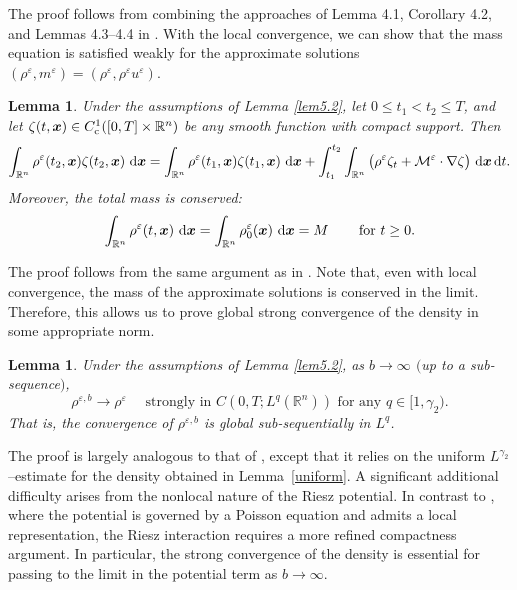 \documentclass[reqno,11pt]{amsart}
\numberwithin{equation}{section}
\newtheorem{lemma}[theorem]{Lemma}
\theoremstyle{definition}
\def\v{\varepsilon}
\def\dd{{\, \rm d}}
\def\M{{\mathcal{M}}}
\begin{document}
The proof follows from combining the approaches of Lemma 4.1, Corollary 4.2, and Lemmas 4.3--4.4 in \cite{Chen2021}. With the local convergence, we can show that the mass equation is satisfied weakly 
for the approximate solutions $(\rho^\v,m^\v) = (\rho^\v,\rho^\v u^\v)$.

\begin{lemma}
Under the assumptions of {\rm Lemma {\rm \ref{lem5.2}}}, let $0\leq t_1<t_2\leq T$, and let $\zeta(t,\boldsymbol{x})\in C^1_{\rm c}([0,T]\times\mathbb{R}^n)$
be any smooth function with compact support.
Then
\begin{align*}
	\int_{\mathbb{R}^n} \rho^{\v}(t_2,\boldsymbol{x}) \zeta(t_2,\boldsymbol{x})\, \dd\boldsymbol{x}
	=\int_{\mathbb{R}^n} \rho^{\v}(t_1,\boldsymbol{x}) \zeta(t_1,\boldsymbol{x})\, \dd\boldsymbol{x}
	+\int_{t_1}^{t_2} \int_{\mathbb{R}^n} \big(\rho^{\v} \zeta_t + \M^{\v}\cdot\nabla\zeta\big)\,\dd\boldsymbol{x}\dd t.
\end{align*}
Moreover, the total mass is conserved{\rm:}
\begin{equation*}
	\int_{\mathbb{R}^n} \rho^\v(t,\boldsymbol{x})\, \dd\boldsymbol{x}=\int_{\mathbb{R}^n} \rho_0^\v(\boldsymbol{x})\, \dd\boldsymbol{x}=M\qquad\, \mbox{for $t\geq0$}.
\end{equation*}
\end{lemma}

The proof follows from the same argument as in \cite{Chen2021}. 
Note that, even with local convergence, 
the mass of the approximate solutions is conserved in the limit. 
Therefore, this allows us to prove global strong convergence of the density in some appropriate norm.
\begin{lemma}
Under the assumptions of {\rm Lemma {\rm \ref{lem5.2}}}, as $b\rightarrow\infty$ $($up to a sub-sequence$)$,
	\begin{equation*}
	\rho^{\v,b} \longrightarrow \rho^{\v}  \quad
 \text{ strongly in $C(0,T; L^q(\mathbb{R}^n))$ for any $q \in [1,\gamma_2)$}.
	\end{equation*}
That is, the convergence of $\rho^{\v,b}$ is global sub-sequentially in $L^q$.
\end{lemma}

The proof is largely analogous to that of \cite{Carrillo2025}, except that it relies on the 
uniform $L^{\gamma_2}$--estimate for the density obtained in Lemma~\ref{uniform}. 
A significant additional difficulty arises from the nonlocal nature of the Riesz potential. 
In contrast to \cite{Chen_2024,Chen2021}, where the potential is governed by a Poisson equation 
and admits a local representation, the Riesz interaction requires a more refined compactness 
argument. In particular, the strong convergence of the density 
is essential for passing to the limit in the potential term as $b\to \infty$.
\end{document}
